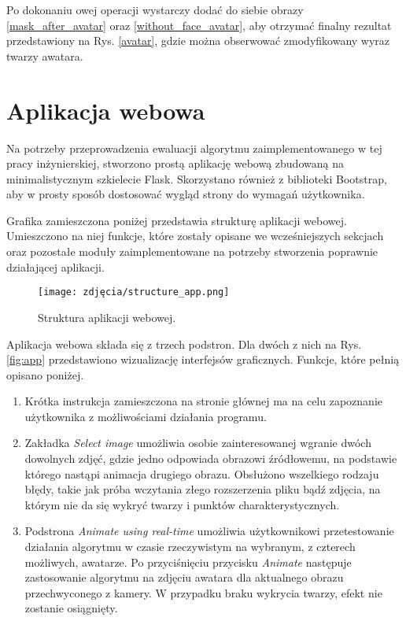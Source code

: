 Po dokonaniu owej operacji wystarczy dodać do siebie obrazy \ref{mask_after_avatar} oraz \ref{without_face_avatar}, aby otrzymać finalny rezultat przedstawiony na Rys. \ref{avatar}, gdzie można obserwować zmodyfikowany wyraz twarzy awatara.



\section{Aplikacja webowa}
Na potrzeby przeprowadzenia ewaluacji algorytmu zaimplementowanego w tej pracy inżynierskiej, stworzono prostą aplikację webową zbudowaną na minimalistycznym szkielecie Flask. Skorzystano również z biblioteki Bootstrap, aby w prosty sposób dostosować wygląd strony do wymagań użytkownika.

Grafika zamieszczona poniżej przedstawia strukturę aplikacji webowej. Umieszczono na niej funkcje, które zostały opisane we wcześniejszych sekcjach oraz pozostałe moduły zaimplementowane na potrzeby stworzenia poprawnie działającej aplikacji.

\begin{figure}[h]
	\centering
	\texttt{[image: zdjęcia/structure\_app.png]}
	\caption{Struktura aplikacji webowej.} 
	\label{fig:structureApp}
\end{figure}

Aplikacja webowa składa się z trzech podstron. Dla dwóch z nich na Rys. \ref{fig:app} przedstawiono wizualizację interfejsów graficznych. Funkcje, które pełnią opisano poniżej.

\begin{enumerate}
    \item Krótka instrukcja zamieszczona na stronie głównej ma na celu zapoznanie użytkownika z możliwościami działania programu.
    \item Zakładka \textit{Select image} umożliwia osobie zainteresowanej wgranie dwóch dowolnych zdjęć, gdzie jedno odpowiada obrazowi źródłowemu, na podstawie którego nastąpi animacja drugiego obrazu. Obsłużono wszelkiego rodzaju błędy, takie jak próba wczytania złego rozszerzenia pliku bądź zdjęcia, na którym nie da się wykryć twarzy i punktów charakterystycznych.
    \item Podstrona \textit{Animate using real-time} umożliwia użytkownikowi przetestowanie działania algorytmu w czasie rzeczywistym na wybranym, z czterech możliwych, awatarze. Po przyciśnięciu przycisku \textit{Animate} następuje zastosowanie algorytmu na zdjęciu awatara dla aktualnego obrazu przechwyconego z kamery. W przypadku braku wykrycia twarzy, efekt nie zostanie osiągnięty.
\end{enumerate}

